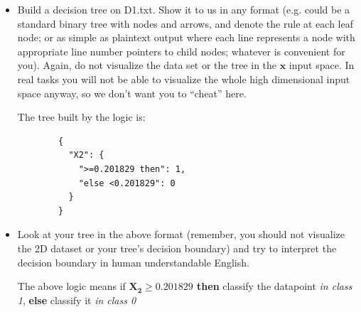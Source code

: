 \documentclass[a4paper]{article}
\theoremstyle{definition}
\def\x{\mathbf x}
\newenvironment{soln}{
    \leavevmode\color{blue}\ignorespaces
}{}
\begin{document}
\begin{enumerate}
\begin{itemize}
  \item Build a decision tree on D1.txt.  Show it to us in any format (e.g. could be a standard binary tree with nodes and arrows, and denote the rule at each leaf node; or as simple as plaintext output where each line represents a node with appropriate line number pointers to child nodes; whatever is convenient for you). Again, do not visualize the data set or the tree in the $\x$ input space.  In real tasks you will not be able to visualize the whole high dimensional input space anyway, so we don't want you to ``cheat'' here.
  \begin{soln}
      The tree built by the logic is:
        \begin{lstlisting}
        {
          "X2": {
            ">=0.201829 then": 1,
            "else <0.201829": 0
          }
        }
        \end{lstlisting}
  \end{soln}
  
  \item Look at your tree in the above format (remember, you should not visualize the 2D dataset or your tree's decision boundary) and try to interpret the decision boundary in human understandable English. 
  \begin{soln}
      The above logic means if \textbf{$\mathbf{X_2\geq0.201829}$ then} classify the datapoint \textit{in class 1}, \textbf{else} classify it \textit{in class 0}
  \end{soln}
  

\end{itemize}
\end{enumerate}
\end{document}
